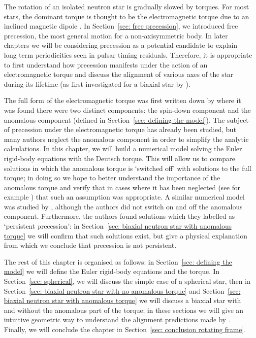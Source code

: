 \documentclass[../full_thesis/full_thesis.tex]{subfiles}
\begin{document}
The rotation of an isolated neutron star is gradually slowed by torques. For
most stars, the dominant torque is thought to be the electromagnetic torque due
to an inclined magnetic dipole \citep{Pacini1968, Gunn1969}. In
Section~\ref{sec: free precession}, we introduced free precession, the most
general motion for a non-axisymmetric body. In later chapters we will be
considering precession as a potential candidate to explain long term
periodicities seen in pulsar timing residuals. Therefore, it is appropriate to
first understand how precession manifests under the action of an
electromagnetic torque and discuss the alignment of various axes of the star
during its lifetime (as first investigated for a biaxial star by
\citet{Goldreich1970}).

The full form of the
electromagnetic torque was first written down by \citet{Deutsch1955} where it
was found there were two distinct components: the spin-down component and
the anomalous component (defined in Section~\ref{sec: defining the model}). The
subject of precession under the electromagnetic torque has already been
studied, but many authors neglect the anomalous component in order to simplify
the analytic calculations. In this chapter, we will build a numerical model
solving the Euler rigid-body equations with the Deutsch torque. This will allow
us to compare solutions in which the anomalous torque is `switched off' with
solutions to the full torque; in doing so we hope to better understand the
importance of the anomalous torque and verify that in cases where it has been
neglected (see for example \citep{Goldreich1970}) that such an assumption was
appropriate. A similar numerical model was studied by \citet{Melatos2000},
although the authors did not switch on and off the anomalous component.
Furthermore, the authors found solutions which they labelled as `persistent
precession': in Section~\ref{sec: biaxial neutron star with anomalous torque} we will
confirm that such solutions exist, but give a physical explanation from which we
conclude that precession is not persistent.

The rest of this chapter is organised as follows: in Section~\ref{sec:
defining the model} we will define the Euler rigid-body equations and the
\citet{Deutsch1955} torque. In Section~\ref{sec: spherical}, we will discuss the
simple case of a spherical star, then in Section~\ref{sec: biaxial neutron star with no anomalous
torque} and Section~\ref{sec: biaxial neutron star with anomalous torque} we will discuss a
biaxial star with and without the anomalous part of the torque; in these
sections we will give an intuitive geometric way to understand the alignment
predictions made by \citet{Goldreich1970}. Finally, we will conclude the chapter
in Section~\ref{sec: conclusion rotating frame}.
\end{document}
